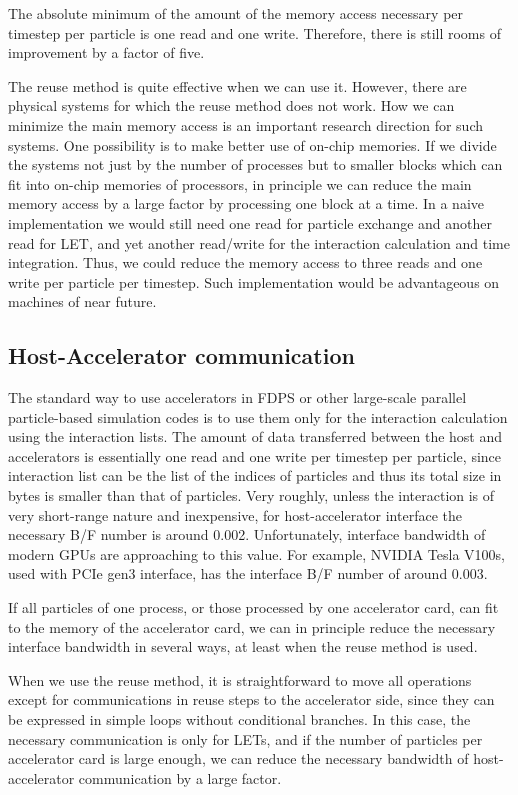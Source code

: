 The absolute minimum of the amount of the memory access necessary per
timestep per particle is one read and one write. Therefore, there is
still rooms of improvement by a factor of five.

The reuse method is quite effective when we can use it. However, there
are physical systems for which the reuse method does not work. How we can
minimize the main memory access is an important research direction for
such systems.  One possibility is to make better use of on-chip
memories.  If we divide the systems not just by the number of
processes but to smaller blocks which can fit into on-chip memories of
processors, in principle we can reduce the main memory access by a
large factor by processing one block at a time. In a naive
implementation we would still need one read for particle exchange and
another read for LET, and yet another read/write for the interaction
calculation and time integration.  Thus, we could reduce the memory
access to three reads and one write per particle per timestep. Such
implementation would be advantageous on machines of near future.

\subsection{Host-Accelerator communication}

The standard way to use accelerators in FDPS or other large-scale
parallel particle-based simulation codes is to use them only for
the interaction calculation using the interaction lists. The amount of
data transferred between the host and accelerators is essentially one
read and one write per timestep per particle, since interaction list
can be the list of the indices of particles and thus its total size in
bytes is smaller  than that of particles. Very roughly, unless the
interaction is of very short-range nature and inexpensive, for
host-accelerator interface the necessary B/F number is around
0.002. Unfortunately, interface bandwidth of modern GPUs are
approaching to this value. For example, NVIDIA Tesla V100s, used with
PCIe gen3 interface, has the interface B/F number of around 0.003. 

If all  particles of one  process, or those processed by one
accelerator card, can fit to the memory of the accelerator card, we can
in principle reduce the necessary interface bandwidth in several ways,
at least when the reuse method is used.

When we use the reuse method, it is straightforward to move all
operations except for communications  in reuse steps to the accelerator
side, since they can be expressed in  simple loops without conditional
branches. In this case, the necessary communication is only for LETs,
and if the number of particles per accelerator card is large enough,
we can reduce the necessary bandwidth of host-accelerator
communication by a large factor.

